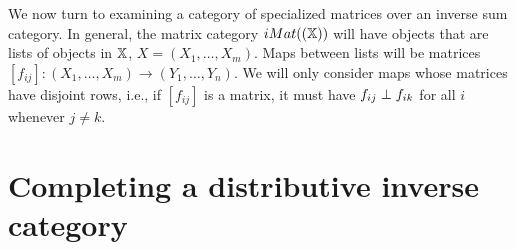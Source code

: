 We now turn to examining a category of specialized matrices over an inverse sum category. In
general, the
matrix category $iMat({(\mathbb{X})})$ will have objects that are lists of objects in $\mathbb{X}$,
$X=(X_1,\ldots,X_m)$. Maps between lists will be matrices $[f_{i j}]: (X_1,\ldots,X_m) \to
(Y_1,\ldots,Y_n)$. We will only consider maps whose matrices have disjoint rows, i.e., if
$[f_{i j}]$ is a matrix, it must have $f_{i j} \perp f_{i k}$ for all $i$ whenever $j \ne k$.











%
%
%


\section{Completing a distributive inverse category} %
\label{sec:completing_a_distributive_inverse_category}

